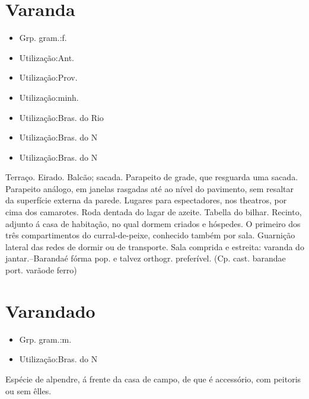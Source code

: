 \documentclass{article}
\begin{document}
\section{Varanda}
\begin{itemize}
\item {Grp. gram.:f.}
\end{itemize}
\begin{itemize}
\item {Utilização:Ant.}
\end{itemize}
\begin{itemize}
\item {Utilização:Prov.}
\end{itemize}
\begin{itemize}
\item {Utilização:minh.}
\end{itemize}
\begin{itemize}
\item {Utilização:Bras. do Rio}
\end{itemize}
\begin{itemize}
\item {Utilização:Bras. do N}
\end{itemize}
\begin{itemize}
\item {Utilização:Bras. do N}
\end{itemize}
Terraço.
Eirado.
Balcão; sacada.
Parapeito de grade, que resguarda uma sacada.
Parapeito análogo, em janelas rasgadas até ao nível do pavimento, sem resaltar da superfície externa da parede.
Lugares para espectadores, nos theatros, por cima dos camarotes.
Roda dentada do lagar de azeite.
Tabella do bilhar.
Recinto, adjunto á casa de habitação, no qual dormem criados e hóspedes.
O primeiro dos três compartimentos do curral-de-peixe, conhecido também por \textunderscore sala\textunderscore .
Guarnição lateral das redes de dormir ou de transporte.
Sala comprida e estreita: \textunderscore varanda do jantar\textunderscore .--\textunderscore Baranda\textunderscore  é fórma pop. e talvez orthogr. preferível.
(Cp. cast. \textunderscore baranda\textunderscore  e port. \textunderscore varão\textunderscore  de ferro)
\section{Varandado}
\begin{itemize}
\item {Grp. gram.:m.}
\end{itemize}
\begin{itemize}
\item {Utilização:Bras. do N}
\end{itemize}
Espécie de alpendre, á frente da casa de campo, de que é accessório, com peitoris ou sem êlles.
\end{document}
